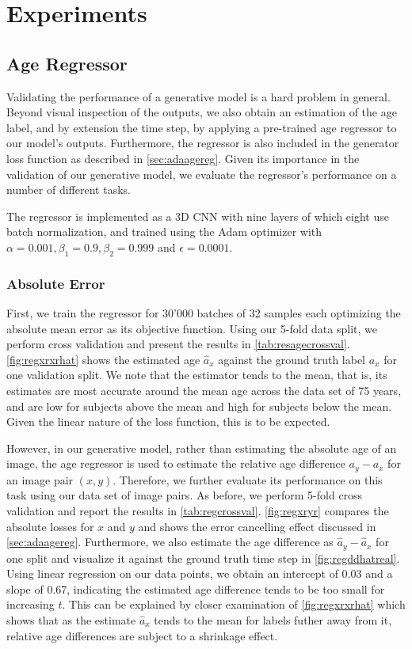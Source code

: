 \chapter{Experiments}

\section{Age Regressor} \label{sec:expagereg}
Validating the performance of a generative model is a hard problem in general. Beyond visual inspection of the outputs, we also obtain an estimation of the age label, and by extension the time step, by applying a pre-trained age regressor to our model's outputs. Furthermore, the regressor is also included in the generator loss function as described in \autoref{sec:adaagereg}. Given its importance in the validation of our generative model, we evaluate the regressor's performance on a number of different tasks.

The regressor is implemented as a 3D CNN with nine layers of which eight use batch normalization, and trained using the Adam optimizer with $\alpha = 0.001, \beta_1 = 0.9, \beta_2 = 0.999 $ and $ \epsilon = 0.0001 $.

\subsection*{Absolute Error}
First, we train the regressor for 30'000 batches of 32 samples each optimizing the absolute mean error as its objective function. Using our 5-fold data split, we perform cross validation and present the results in \autoref{tab:resagecrossval}. \autoref{fig:regxrxrhat} shows the estimated age $ \hat a_x $ against the ground truth label $a_x$ for one validation split. We note that the estimator tends to the mean, that is, its estimates are most accurate around the mean age across the data set of 75 years, and are low for subjects above the mean and high for subjects below the mean. Given the linear nature of the loss function, this is to be expected.

However, in our generative model, rather than estimating the absolute age of an image, the age regressor is used to estimate the relative age difference $a_y - a_x$ for an image pair $(x, y)$. Therefore, we further evaluate its performance on this task using our data set of image pairs. As before, we perform 5-fold cross validation and report the results in \autoref{tab:regcrossval}. \autoref{fig:regxryr} compares the absolute losses for $x$ and $y$ and shows the error cancelling effect discussed in \autoref{sec:adaagereg}. Furthermore, we also estimate the age difference as $\hat a_y - \hat a_x$ for one split and visualize it against the ground truth time step in \autoref{fig:regddhatreal}. Using linear regression on our data points, we obtain an intercept of 0.03 and a slope of 0.67, indicating the estimated age difference tends to be too small for increasing $t$. This can be explained by closer examination of \autoref{fig:regxrxrhat} which shows that as the estimate $\hat a_x$ tends to the mean for labels futher away from it, relative age differences are subject to a shrinkage effect. 


